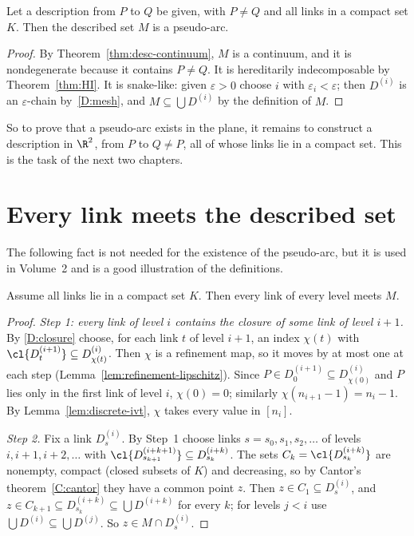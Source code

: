 \begin{theorem}\label{thm:desc-pseudoarc}
Let a description from $P$ to $Q$ be given, with $P\neq Q$ and all links in a compact set $K$.
Then the described set $M$ is a pseudo-arc.
\end{theorem}

\begin{proof}
By Theorem~\ref{thm:desc-continuum}, $M$ is a continuum, and it is nondegenerate because it
contains $P\neq Q$. It is hereditarily indecomposable by Theorem~\ref{thm:HI}. It is
snake-like: given $\varepsilon>0$ choose $i$ with $\varepsilon_i<\varepsilon$; then $D^{(i)}$ is an
$\varepsilon$-chain by~\ref{D:mesh}, and $M\subseteq\bigcup D^{(i)}$ by the definition of $M$.
\end{proof}


So to prove that a pseudo-arc exists in the plane, it remains to construct a description in
$\R^2$, from $P$ to $Q\neq P$, all of whose links lie in a compact set. This is the task of the
next two chapters.

\section{Every link meets the described set}

The following fact is not needed for the existence of the pseudo-arc, but it is used in
Volume~2 and is a good illustration of the definitions.

\begin{proposition}\label{prop:link-meets}
Assume all links lie in a compact set $K$. Then every link of every level meets $M$.
\end{proposition}

\begin{proof}
\emph{Step 1: every link of level $i$ contains the closure of some link of level $i+1$.} By
\ref{D:closure} choose, for each link $t$ of level $i+1$, an index $\chi(t)$ with
$\cl{D^{(i+1)}_t}\subseteq D^{(i)}_{\chi(t)}$. Then $\chi$ is a refinement map, so it moves by at
most one at each step (Lemma~\ref{lem:refinement-lipschitz}). Since $P\in D^{(i+1)}_0\subseteq
D^{(i)}_{\chi(0)}$ and $P$ lies only in the first link of level $i$, $\chi(0)=0$; similarly
$\chi(n_{i+1}-1)=n_i-1$. By Lemma~\ref{lem:discrete-ivt}, $\chi$ takes every value in $[n_i]$.

\emph{Step 2.} Fix a link $D^{(i)}_s$. By Step~1 choose links $s=s_0,s_1,s_2,\dots$ of levels
$i,i+1,i+2,\dots$ with $\cl{D^{(i+k+1)}_{s_{k+1}}}\subseteq D^{(i+k)}_{s_k}$. The sets
$C_k=\cl{D^{(i+k)}_{s_k}}$ are nonempty, compact (closed subsets of $K$) and decreasing, so by
Cantor's theorem~\ref{C:cantor} they have a common point $z$. Then $z\in C_1\subseteq
D^{(i)}_s$, and $z\in C_{k+1}\subseteq D^{(i+k)}_{s_k}\subseteq\bigcup D^{(i+k)}$ for every $k$;
for levels $j<i$ use $\bigcup D^{(i)}\subseteq\bigcup D^{(j)}$. So $z\in M\cap D^{(i)}_s$.
\end{proof}

